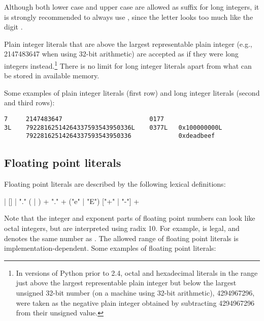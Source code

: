 Although both lower case  and upper case  are
allowed as suffix for long integers, it is strongly recommended to always
use , since the letter  looks too much like the
digit .

Plain integer literals that are above the largest representable plain
integer (e.g., 2147483647 when using 32-bit arithmetic) are accepted
as if they were long integers instead.\footnote{In versions of Python
prior to 2.4, octal and hexadecimal literals in the range just above
the largest representable plain integer but below the largest unsigned
32-bit number (on a machine using 32-bit arithmetic), 4294967296, were
taken as the negative plain integer obtained by subtracting 4294967296
from their unsigned value.}  There is no limit for long integer
literals apart from what can be stored in available memory.

Some examples of plain integer literals (first row) and long integer
literals (second and third rows):

\begin{verbatim}
7     2147483647                        0177
3L    79228162514264337593543950336L    0377L   0x100000000L
      79228162514264337593543950336             0xdeadbeef						    
\end{verbatim}


\subsection{Floating point literals\label{floating}}

Floating point literals are described by the following lexical
definitions:

\begin{productionlist}
             { | }
             {[]  |  "."}
             {( | )
              }
             {+}
             {"." +}
             {("e" | "E") ["+" | "-"] +}
\end{productionlist}

Note that the integer and exponent parts of floating point numbers
can look like octal integers, but are interpreted using radix 10.  For
example,  is legal, and denotes the same number
as .
The allowed range of floating point literals is
implementation-dependent.
Some examples of floating point literals:

